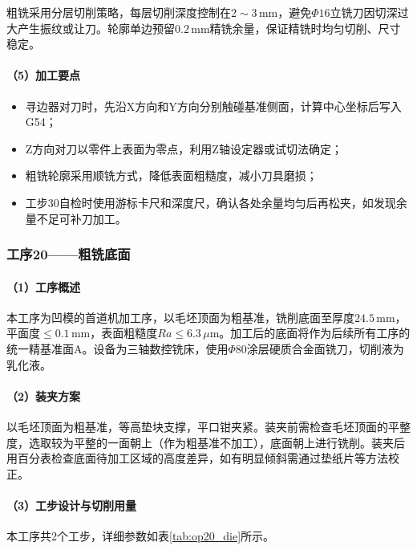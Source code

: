 \documentclass{xautCADreport}
\begin{document}
粗铣采用分层切削策略，每层切削深度控制在$2\sim3\,\mathrm{mm}$，避免$\Phi16$立铣刀因切深过大产生振纹或让刀。轮廓单边预留$0.2\,\mathrm{mm}$精铣余量，保证精铣时均匀切削、尺寸稳定。

\paragraph{（5）加工要点}

\begin{itemize}
  \item 寻边器对刀时，先沿X方向和Y方向分别触碰基准侧面，计算中心坐标后写入G54；
  \item Z方向对刀以零件上表面为零点，利用Z轴设定器或试切法确定；
  \item 粗铣轮廓采用顺铣方式，降低表面粗糙度，减小刀具磨损；
  \item 工步30自检时使用游标卡尺和深度尺，确认各处余量均匀后再松夹，如发现余量不足可补刀加工。
\end{itemize}

\subsubsection{工序20——粗铣底面}

\paragraph{（1）工序概述}

本工序为凹模的首道机加工序，以毛坯顶面为粗基准，铣削底面至厚度$24.5\,\mathrm{mm}$，平面度$\leq0.1\,\mathrm{mm}$，表面粗糙度$Ra\leq6.3\,\mu\mathrm{m}$。加工后的底面将作为后续所有工序的统一精基准面A。设备为三轴数控铣床，使用$\Phi80$涂层硬质合金面铣刀，切削液为乳化液。

\paragraph{（2）装夹方案}

以毛坯顶面为粗基准，等高垫块支撑，平口钳夹紧。装夹前需检查毛坯顶面的平整度，选取较为平整的一面朝上（作为粗基准不加工），底面朝上进行铣削。装夹后用百分表检查底面待加工区域的高度差异，如有明显倾斜需通过垫纸片等方法校正。

\paragraph{（3）工步设计与切削用量}

本工序共2个工步，详细参数如表\ref{tab:op20_die}所示。
\end{document}
